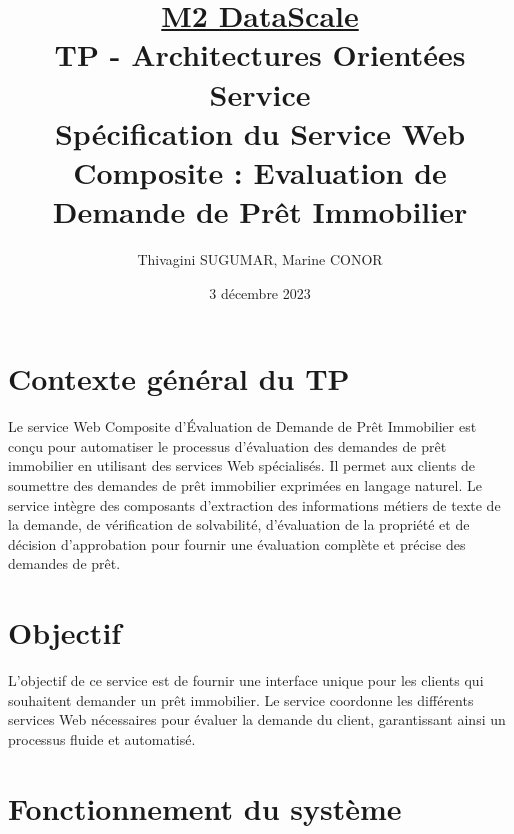 \documentclass{article}
\begin{document}
	\author{Thivagini SUGUMAR, Marine CONOR}
	\date{3 décembre 2023}
	
	\title{\underline{\textbf{M2 DataScale}}\\
		\bigskip
		\textbf{TP - Architectures Orientées Service}\\
		\bigskip
		Spécification du Service Web Composite : Evaluation de Demande de Prêt Immobilier
		\bigskip}
	
	\maketitle
	\newpage
	\tableofcontents
	\newpage
	
	\section{Contexte général du TP}
	Le service Web Composite d'Évaluation de Demande de Prêt Immobilier est conçu pour automatiser le processus d'évaluation des demandes de prêt immobilier en utilisant des services Web spécialisés. 
	\newline Il permet aux clients de soumettre des demandes de prêt immobilier exprimées en langage naturel. Le service intègre des composants d’extraction des informations métiers de texte de la demande, de vérification de solvabilité, d'évaluation de la propriété et de décision d'approbation pour fournir une évaluation complète et précise des demandes de prêt. 
	
	\section{Objectif}
	L'objectif de ce service est de fournir une interface unique pour les clients qui souhaitent demander un prêt immobilier. Le service coordonne les différents services Web nécessaires pour évaluer la demande du client, garantissant ainsi un processus fluide et automatisé.
	
	
	\section{Fonctionnement du système}
\end{document}
